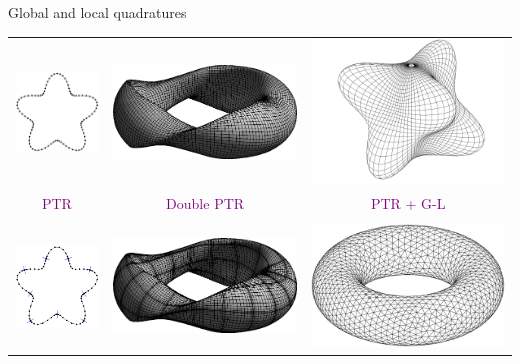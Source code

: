 \documentclass[t]{beamer}
\newcommand{\com}[1]{{\scriptsize \textcolor{purple}{#1}}}      %
\begin{document}
\begin{noframe}[c]{Global and local quadratures}
  \begin{center}
    \begin{tabular}{ccc}
      \includegraphics[height=0.2\textwidth]{fig/starfish_trapz}
      &
        \includegraphics[height=0.18\textwidth]{fig/stellarator_trapz}
      &
        \includegraphics[height=0.18\textwidth]{fig/spharm_geo}
      \\
      \com{PTR} & \com{Double PTR} & \com{PTR + G-L} \\
      \hline
      \vspace{-1em}
      \\
      \includegraphics[height=0.2\textwidth]{fig/starfish_panels}
      &
        \includegraphics[height=0.18\textwidth]{fig/stellarator_gl}
      &
        \includegraphics[height=0.18\textwidth]{fig/torus_triangulation}

\end{tabular}
\end{center}
\end{noframe}
\end{document}
